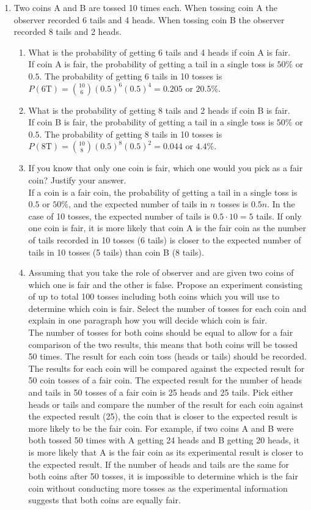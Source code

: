 \documentclass[12pt]{article}
\begin{document}
\begin{enumerate}
    \item Two coins A and B are tossed 10 times each. When tossing coin A the observer recorded 6 tails and 4 heads. When tossing coin B the observer recorded 8 tails and 2 heads. 
    \begin{enumerate}
        \item What is the probability of getting 6 tails and 4 heads if coin A is fair. \\
        If coin A is fair, the probability of getting a tail in a single toss is $50\%$ or $0.5$. The probability of getting 6 tails in 10 tosses is $P(6\text{T}) = {10 \choose 6} (0.5)^6 (0.5)^4 = 0.205$ or $20.5\%$.
        \item What is the probability of getting 8 tails and 2 heads if coin B is fair. \\
        If coin B is fair, the probability of getting a tail in a single toss is $50\%$ or $0.5$. The probability of getting 8 tails in 10 tosses is $P(8\text{T}) = {10 \choose 8} (0.5)^8 (0.5)^2 = 0.044$ or $4.4\%$.
        \item If you know that only one coin is fair, which one would you pick as a fair coin? Justify your answer. \\
        If a coin is a fair coin, the probability of getting a tail in a single toss is $0.5$ or $50\%$, and the expected number of tails in $n$ tosses is $0.5n$. In the case of 10 tosses, the expected number of tails is $0.5 \cdot 10 = 5$ tails. If only one coin is fair, it is more likely that coin A is the fair coin as the number of tails recorded in 10 tosses (6 tails) is closer to the expected number of tails in 10 tosses (5 tails) than coin B (8 tails).
        \item Assuming that you take the role of observer and are given two coins of which one is fair and the other is false. Propose an experiment consisting of up to total 100 tosses including both coins which you will use to determine which coin is fair. Select the number of tosses for each coin and explain in one paragraph how you will decide which coin is fair. \\
        The number of tosses for both coins should be equal to allow for a fair comparison of the two results, this means that both coins will be tossed 50 times. The result for each coin toss (heads or tails) should be recorded. The results for each coin will be compared against the expected result for 50 coin tosses of a fair coin. The expected result for the number of heads and tails in 50 tosses of a fair coin is 25 heads and 25 tails. Pick either heads or tails and compare the number of the result for each coin against the expected result (25), the coin that is closer to the expected result is more likely to be the fair coin. For example, if two coins A and B were both tossed 50 times with A getting 24 heads and B getting 20 heads, it is more likely that A is the fair coin as its experimental result is closer to the expected result. If the number of heads and tails are the same for both coins after 50 tosses, it is impossible to determine which is the fair coin without conducting more tosses as the experimental information suggests that both coins are equally fair. 
    \end{enumerate}
\end{enumerate}
\end{document}
